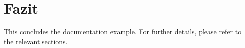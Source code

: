 \section{Fazit}
This concludes the documentation example. For further details, please refer to the relevant sections.
